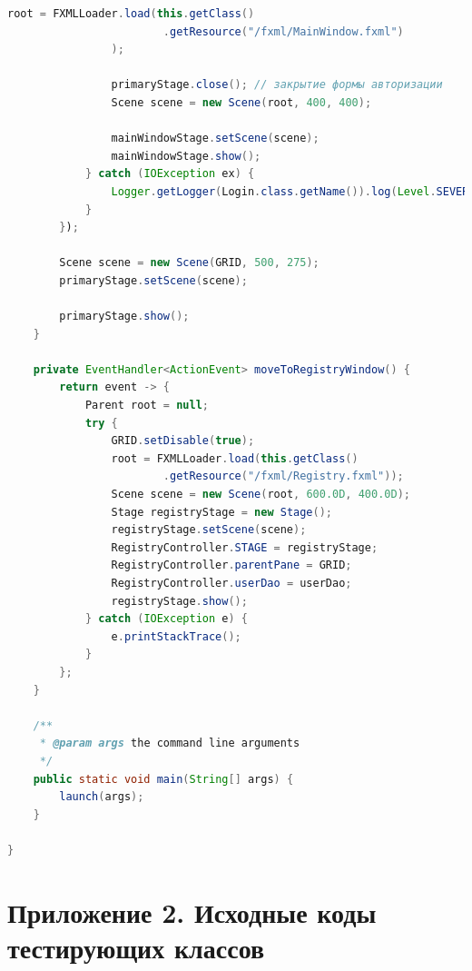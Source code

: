 \documentclass[a4paper,12pt]{article}
\begin{document}
\begin{lstlisting}[language=java, caption=код модуля Login.java]
                root = FXMLLoader.load(this.getClass()
                        .getResource("/fxml/MainWindow.fxml")
                );

                primaryStage.close(); // закрытие формы авторизации
                Scene scene = new Scene(root, 400, 400);

                mainWindowStage.setScene(scene);
                mainWindowStage.show();
            } catch (IOException ex) {
                Logger.getLogger(Login.class.getName()).log(Level.SEVERE, null, ex);
            }
        });

        Scene scene = new Scene(GRID, 500, 275);
        primaryStage.setScene(scene);

        primaryStage.show();
    }

    private EventHandler<ActionEvent> moveToRegistryWindow() {
        return event -> {
            Parent root = null;
            try {
                GRID.setDisable(true);
                root = FXMLLoader.load(this.getClass()
                        .getResource("/fxml/Registry.fxml"));
                Scene scene = new Scene(root, 600.0D, 400.0D);
                Stage registryStage = new Stage();
                registryStage.setScene(scene);
                RegistryController.STAGE = registryStage;
                RegistryController.parentPane = GRID;
                RegistryController.userDao = userDao;
                registryStage.show();
            } catch (IOException e) {
                e.printStackTrace();
            }
        };
    }

    /**
     * @param args the command line arguments
     */
    public static void main(String[] args) {
        launch(args);
    }

}

\end{lstlisting}

\newpage\section*{Приложение 2. Исходные коды тестирующих классов}
\end{document}
